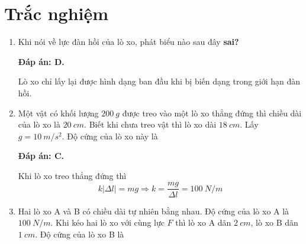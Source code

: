 \whiteBGstarBegin
\setcounter{section}{0}
\section{Trắc nghiệm}
\begin{enumerate}[label=\bfseries Câu \arabic*:]
	
	\item {}
	
	\cauhoi
	{Khi nói về lực đàn hồi của lò xo, phát biểu nào sau đây \textbf{sai?}
	}
	
	\loigiai
	{	\textbf{Đáp án: D.}
		
	Lò xo chỉ lấy lại được hình dạng ban đầu khi bị biến dạng trong giới hạn đàn hồi.
	}
	\item {}
	
	\cauhoi
	{Một vật có khối lượng $\SI{200}{g}$ được treo vào một lò xo thẳng đứng thì chiều dài của lò xo là $\SI{20}{cm}$. Biết khi chưa treo vật thì lò xo dài $\SI{18}{cm}$. Lấy $g=\SI{10}{m/s^2}$. Độ cứng của lò xo này là
	}
	\loigiai
	{	\textbf{Đáp án: C.}
		
	Khi lò xo treo thẳng đứng thì
	$$k|\Delta l| = mg \Rightarrow k =\dfrac{mg}{\Delta l} = \SI{100}{N/m}$$
	
	}
	
	\item {}
	
	\cauhoi
	{Hai lò xo A và B có chiều dài tự nhiên bằng nhau. Độ cứng của lò xo A là $\SI{100}{N/m}$. Khi kéo hai lò xo với cùng lực $F$ thì lò xo A dãn $\SI{2}{cm}$, lò xo B dãn $\SI{1}{cm}$. Độ cứng của lò xo B là
	}
	

\end{enumerate}

